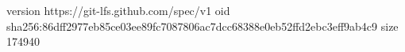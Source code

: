 version https://git-lfs.github.com/spec/v1
oid sha256:86dff2977eb85ce03ee89fc7087806ac7dcc68388e0eb52ffd2ebc3eff9ab4c9
size 174940
